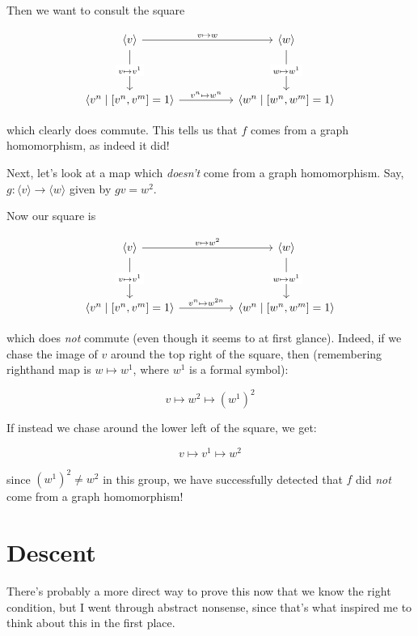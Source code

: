 \documentclass[12pt]{article}
\theoremstyle{definition}
\theoremstyle{theorem}
\begin{document}
Then we want to consult the square

\[\begin{tikzcd}
	{\langle v \rangle} && {\langle w \rangle} \\
	\\
	{\langle v^n \mid [v^n,v^m] = 1 \rangle} && {\langle w^n \mid [w^n, w^m] = 1 \rangle}
	\arrow["{v \mapsto w}", from=1-1, to=1-3]
	\arrow["{v^n \mapsto w^n}", from=3-1, to=3-3]
	\arrow["{v \mapsto v^1}"{description}, from=1-1, to=3-1]
	\arrow["{w \mapsto w^1}"{description}, from=1-3, to=3-3]
\end{tikzcd}\]

which clearly does commute. This tells us that $f$ comes from a graph homomorphism,
as indeed it did!

\bigskip

Next, let's look at a map which \emph{doesn't} come from a graph homomorphism.
Say, $g : \langle v \rangle \to \langle w \rangle$ given by $gv = w^2$.

Now our square is

\[\begin{tikzcd}
	{\langle v \rangle} && {\langle w \rangle} \\
	\\
	{\langle v^n \mid [v^n,v^m] = 1 \rangle} && {\langle w^n \mid [w^n, w^m] = 1 \rangle}
	\arrow["{v \mapsto w^2}", from=1-1, to=1-3]
	\arrow["{v^n \mapsto w^{2n}}", from=3-1, to=3-3]
	\arrow["{v \mapsto v^1}"{description}, from=1-1, to=3-1]
	\arrow["{w \mapsto w^1}"{description}, from=1-3, to=3-3]
\end{tikzcd}\]

which does \emph{not} commute (even though it seems to at first glance). 
Indeed, if we chase the image of $v$ around the top right of the square, then
(remembering righthand map is $w \mapsto w^1$, where $w^1$ is a formal symbol):

\[ v \mapsto w^2 \mapsto (w^1)^2 \]

If instead we chase around the lower left of the square, we get:

\[ v \mapsto v^1 \mapsto w^2 \]

since $(w^1)^2 \neq w^2$ in this group, we have successfully detected that 
$f$ did \emph{not} come from a graph homomorphism!

\section{Descent}

There's probably a more direct way to prove this now that we know the right
condition, but I went through abstract nonsense, since that's what inspired
me to think about this in the first place.
\end{document}
